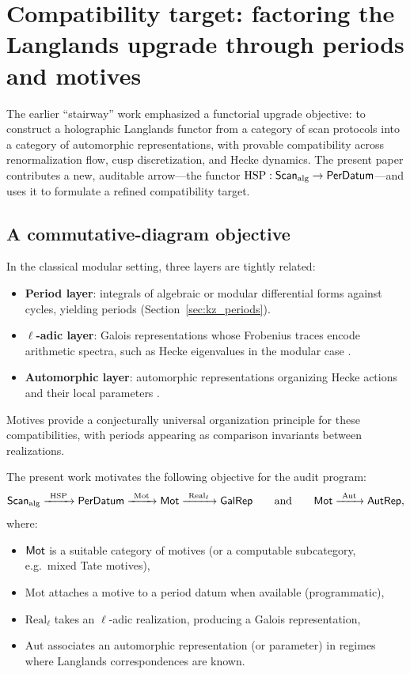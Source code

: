 
\section{Compatibility target: factoring the Langlands upgrade through periods and motives}
\label{sec:langlands_compatibility}

The earlier ``stairway'' work \cite{Ma2025STI} emphasized a functorial upgrade objective: to construct a holographic Langlands functor from a category of scan protocols into a category of automorphic representations, with provable compatibility across renormalization flow, cusp discretization, and Hecke dynamics. The present paper contributes a new, auditable arrow---the functor $\mathrm{HSP}:\mathsf{Scan}_{\mathrm{alg}}\to\mathsf{PerDatum}$---and uses it to formulate a refined compatibility target.

\subsection{A commutative-diagram objective}
\label{sec:commutative_diagram_objective}

In the classical modular setting, three layers are tightly related:
\begin{itemize}
\item \textbf{Period layer}: integrals of algebraic or modular differential forms against cycles, yielding periods (Section~\ref{sec:kz_periods}).
\item \textbf{$\ell$-adic layer}: Galois representations whose Frobenius traces encode arithmetic spectra, such as Hecke eigenvalues in the modular case \cite{Deligne1971Bourbaki,Deligne1974}.
\item \textbf{Automorphic layer}: automorphic representations organizing Hecke actions and their local parameters \cite{Bump1997}.
\end{itemize}
Motives provide a conjecturally universal organization principle for these compatibilities, with periods appearing as comparison invariants between realizations.

The present work motivates the following objective for the audit program:
\begin{equation}
\label{eq:diagram_objective}
\mathsf{Scan}_{\mathrm{alg}}
\xrightarrow{\ \mathrm{HSP}\ }
\mathsf{PerDatum}
\xrightarrow{\ \mathrm{Mot}\ }
\mathsf{Mot}
\xrightarrow{\ \mathrm{Real}_\ell\ }
\mathsf{GalRep}
\qquad\text{and}\qquad
\mathsf{Mot}
\xrightarrow{\ \mathrm{Aut}\ }
\mathsf{AutRep},
\end{equation}
where:
\begin{itemize}
\item $\mathsf{Mot}$ is a suitable category of motives (or a computable subcategory, e.g.\ mixed Tate motives),
\item $\mathrm{Mot}$ attaches a motive to a period datum when available (programmatic),
\item $\mathrm{Real}_\ell$ takes an $\ell$-adic realization, producing a Galois representation,
\item $\mathrm{Aut}$ associates an automorphic representation (or parameter) in regimes where Langlands correspondences are known.
\end{itemize}

